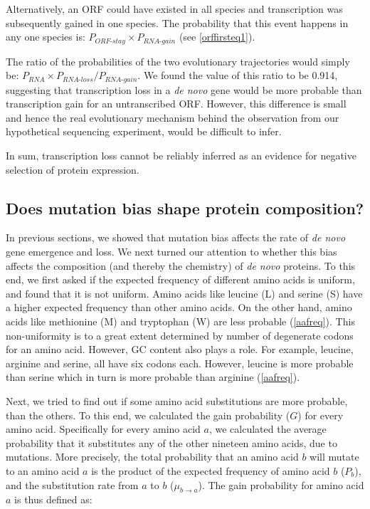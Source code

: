 \documentclass[12pt,a4paper]{article}
\begin{document}
Alternatively, an ORF could have existed in all species and transcription was subsequently gained in one species. The probability that this event happens in any one species is: $P_\textit{ORF-stay}\times P_\textit{RNA-gain}$ (see \autoref{orffirsteq1}). 

The ratio of the probabilities of the two evolutionary trajectories would simply be: $P_\textit{RNA} \times P_\textit{RNA-loss}/P_\textit{RNA-gain}$. We found the value of this ratio to be 0.914, suggesting that transcription loss in a \textit{de novo} gene would be more probable than transcription gain for an untranscribed ORF. However, this difference is small and hence the real evolutionary mechanism behind the observation from our hypothetical sequencing experiment, would be difficult to infer. 

In sum, transcription loss cannot be reliably inferred as an evidence for negative selection of protein expression.

\subsection{Does mutation bias shape protein composition?}

In previous sections, we showed that mutation bias affects the rate of \textit{de novo} gene emergence and loss. We next turned our attention to whether this bias affects the composition (and thereby the chemistry) of \textit{de novo} proteins. To this end, we first asked if the expected frequency of different amino acids is uniform, and found that it is not uniform. Amino acids like leucine (L) and serine (S) have a higher expected frequency than other amino acids. On the other hand, amino acids like methionine (M) and tryptophan (W) are less probable (\autoref{aafreq}). This non-uniformity is to a great extent determined by number of degenerate codons for an amino acid. However, GC content also plays a role. For example, leucine, arginine and serine, all have six codons each. However, leucine is more probable than serine which in turn is more probable than arginine (\autoref{aafreq}). 

Next, we tried to find out if some amino acid substitutions are more probable, than the others. To this end, we calculated the gain probability ($G$) for every amino acid. Specifically for every amino acid $a$, we calculated the average probability that it substitutes any of the other nineteen amino acids, due to mutations. More precisely, the total probability that an amino acid $b$ will mutate to an amino acid $a$ is the product of the expected frequency of amino acid $b$ ($P_b$), and the substitution rate from $a$ to $b$ ($\mu_{b\to a}$). The gain probability for amino acid $a$ is thus defined as:
\end{document}
